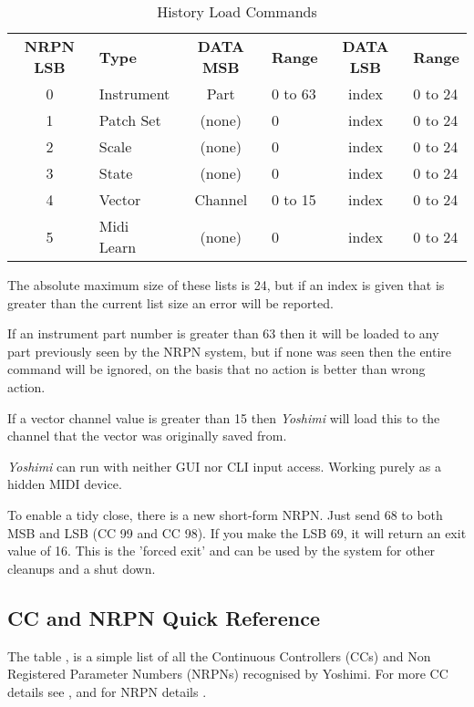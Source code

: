    \begin{table}[H]
      \centering
      \caption{History Load Commands}
      \label{table:history_load_commands}
      \begin{tabular}{c l c l c l}
\textbf{NRPN LSB} & \textbf{Type} & \textbf{DATA MSB} & \textbf{Range} & \textbf{DATA LSB}  & \textbf{Range}\\
        0 & Instrument & Part    & 0 to 63 & index   & 0 to 24 \\
        1 & Patch Set  & (none)  & 0       & index   & 0 to 24 \\
        2 & Scale      & (none)  & 0       & index   & 0 to 24 \\
        3 & State      & (none)  & 0       & index   & 0 to 24 \\
        4 & Vector     & Channel & 0 to 15 & index   & 0 to 24 \\
        5 & Midi Learn & (none)  & 0       & index   & 0 to 24 \\
      \end{tabular}
   \end{table}

   The absolute maximum size of these lists is 24, but if an index is given that
   is greater than the current list size an error will be reported.

   If an instrument part number is greater than 63 then it will be loaded to any
   part previously seen by the NRPN system, but if none was seen then the entire
   command will be ignored, on the basis that no action is better than wrong action.

   If a vector channel value is greater than 15 then \textsl{Yoshimi} will load this
   to the channel that the vector was originally saved from.


   \textsl{Yoshimi} can run with neither GUI nor CLI input access. Working purely as
   a hidden MIDI device.

   To enable a tidy close, there is a new short-form NRPN.
   Just send 68 to both MSB and LSB (CC 99 and CC 98). If you make the LSB 69, it
   will return an exit value of 16. This is the 'forced exit' and can be used by the
   system for other cleanups and a shut down.
\iffalse
\subsection{CC and NRPN Quick Reference}
\label{subsection:cc_nrpn_quick_ref}
   The table , is a simple list of all the
   Continuous Controllers (CCs) and Non Registered Parameter Numbers (NRPNs)
   recognised by Yoshimi.
   For more CC details see , and for NRPN details .


